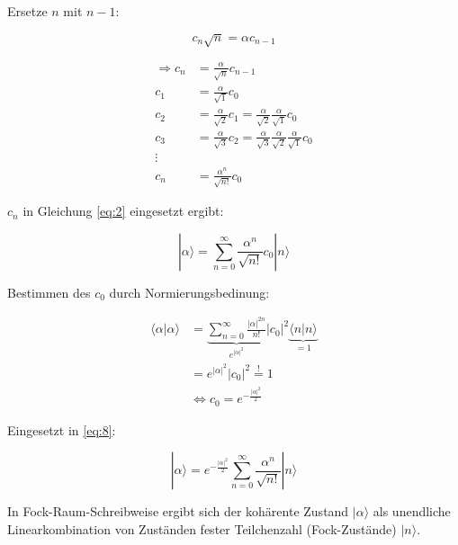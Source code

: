 Ersetze \(n\) mit \(n-1\):

\begin{equation}
  \label{eq:6}
  c_n\sqrt{n} = \alpha c_{n-1}
\end{equation}

\begin{align}
  \label{eq:7}
  \Rightarrow c_n &= \frac{\alpha}{\sqrt{n}}c_{n-1}\\
c_1 &=  \frac{\alpha}{\sqrt{1}}c_{0}\\
c_2 &=  \frac{\alpha}{\sqrt{2}}c_{1} =\frac{\alpha}{\sqrt{2}}\frac{\alpha}{\sqrt{1}}c_{0} \\
c_3 &=  \frac{\alpha}{\sqrt{3}}c_{2} =  \frac{\alpha}{\sqrt{3}} \frac{\alpha}{\sqrt{2}}\frac{\alpha}{\sqrt{1}}c_{0}\\
\vdots\\
c_n &=  \frac{\alpha^n}{\sqrt{n!}}c_{0}
\end{align}

\(c_n\) in Gleichung \eqref{eq:2} eingesetzt ergibt:

\begin{equation}
  \label{eq:8}
  |\alpha\rangle =\sum_{n=0}^{\infty} \frac{\alpha^n}{\sqrt{n!}}c_0 |n\rangle 
\end{equation}

Bestimmen des \(c_0\) durch Normierungsbedinung:

\begin{align}
  \label{eq:9}
  \langle \alpha | \alpha \rangle  &= \underbrace{\sum_{n=0}^{\infty} \frac{|\alpha|^{2n}}{n!}}_{e^{|\alpha|^2}} |c_0|^2 \underbrace{\langle n|n\rangle}_{=1} \\
&= e^{|\alpha|^2}|c_0|^2 \stackrel{!}= 1 \\
 &\Leftrightarrow c_0 = e^{-\frac{|\alpha|^2}{2}} 
\end{align}

Eingesetzt in \eqref{eq:8}:

\begin{equation}
  \label{eq:10}
  \boxed{ |\alpha\rangle =  e^{-\frac{|\alpha|^2}{2}} \sum_{n=0}^{\infty} \frac{\alpha^n}{\sqrt{n!}} |n\rangle }
\end{equation}

In Fock-Raum-Schreibweise ergibt sich der kohärente Zustand \(|\alpha\rangle\) als unendliche Linearkombination von Zuständen fester Teilchenzahl (Fock-Zustände) \(|n\rangle\).



